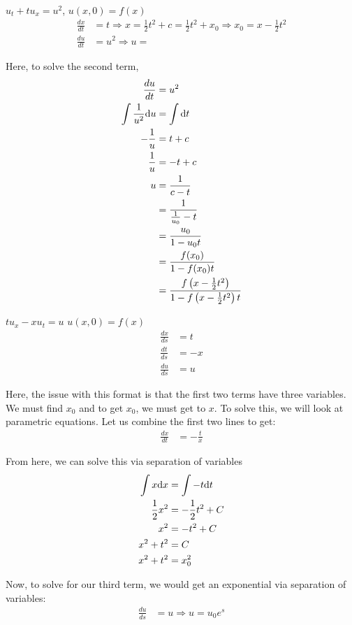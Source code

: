 \documentclass{article}
\begin{document}
\ex $u_t + tu_x = u^2$, $u(x, 0) = f(x)$
%
\begin{align}
  \frac{dx}{dt} & = t \Rightarrow x = \frac{1}{2} t^2 + c
  = \frac{1}{2} t^2 + x_0 \Rightarrow x_0 = x - \frac{1}{2} t^2\\
  \frac{du}{dt} & = u^2 \Rightarrow u =
\end{align}

Here, to solve the second term,
%
\begin{align}
  \frac{du}{dt} & = u^2\\
  \int \frac{1}{u^2} \text du & = \int \text dt\\
  -\frac{1}{u} & = t + c\\
  \frac{1}{u} & = -t + c\\
  u & = \frac{1}{c - t}\\
  & = \frac{1}{\frac{1}{u_0} - t}\\
  & = \frac{u_0}{1 - u_0 t}\\
  & = \frac{f(x_0)}{1 - f(x_0)t}\\
  & = \frac{f\left(x - \frac{1}{2}t^2\right)}
  {1 - f\left(x - \frac{1}{2}t^2\right)t}
\end{align}


\ex $tu_x - xu_t = u$ \quad $u(x, 0) = f(x)$
\begin{align}
  \frac{dx}{ds} & = t\\
  \frac{dt}{ds} & = -x\\
  \frac{du}{ds} & = u
\end{align}

Here, the issue with this format is that the first two terms have three
variables. We must find $x_0$ and to get $x_0$, we must get to $x$. To solve
this, we will look at parametric equations. Let us combine the first two lines to get:
%
\begin{align}
  \frac{dx}{dt} & = - \frac{t}{x}
\end{align}

From here, we can solve this via separation of variables
%
\begin{align}
  \int x \text dx & = \int - t \text dt\\
  \frac{1}{2} x^2 & = -\frac{1}{2} t^2 + C\\
  x^2 & = - t^2 + C\\
  x^2 + t^2 & = C\\
  x^2 + t^2 & = x^2_0
\end{align}

Now, to solve for our third term, we would get an exponential via separation of variables:
%
\begin{align}
  \frac{du}{ds} & = u \Rightarrow u = u_0 e^s
\end{align}
\end{document}
